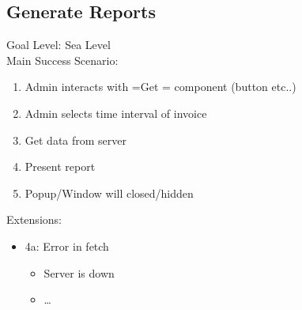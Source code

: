 \documentclass[11pt]{article}
\begin{document}
\subsection{Generate Reports}
\label{sec:org716dce0}
Goal Level: Sea Level \\
Main Success Scenario: \\

\begin{enumerate}
\item Admin interacts with =Get = component (button etc..)
\item Admin selects time interval of invoice
\item Get data from server
\item Present report
\item Popup/Window will closed/hidden
\end{enumerate}

Extensions:
\begin{itemize}
\item 4a: Error in fetch
\begin{itemize}
\item Server is down
\item \ldots{}
\end{itemize}
\end{itemize}
\end{document}
